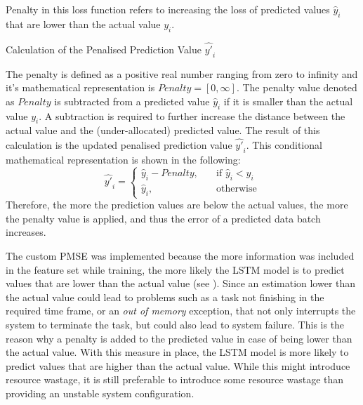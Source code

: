     Penalty in this loss function refers to increasing the loss of predicted values $\hat{y}_i$ that are lower than the actual value $y_i$.

    \begin{pabox}{Calculation of the Penalised Prediction Value $\hat{y'}_i$}
    \label{def:calculation-of-the-penalty-value}

      The penalty is defined as a positive real number ranging from zero to infinity and it's mathematical representation is $Penalty = [0, \infty]$.
      The penalty value denoted as $Penalty$ is subtracted from a predicted value $\hat{y}_i$ if it is smaller than the actual value $y_i$. A subtraction is required to further increase the distance between the actual value and the (under-allocated) predicted value.
      The result of this calculation is the updated penalised prediction value $\hat{y'}_i$.
      This conditional mathematical representation is shown in the following:
      $$\hat{y'}_i = 
      \begin{cases}
        \hat{y}_i - Penalty, & \quad \textrm{if } \hat{y}_i < y_i \\
        \hat{y}_i,  & \quad \textrm{otherwise}
      \end{cases}$$
      Therefore, the more the prediction values are below the actual values, the more the penalty value is applied, and thus the error of a predicted data batch increases.

    \end{pabox}

    The custom PMSE was implemented because the more information was included in the feature set while training, the more likely the LSTM model is to predict values that are lower than the actual value (see ). Since an estimation lower than the actual value could lead to problems such as a task not finishing in the required time frame, or an \emph{out of memory} exception, that not only interrupts the system to terminate the task, but could also lead to system failure. This is the reason why a penalty is added to the predicted value in case of being lower than the actual value. With this measure in place, the LSTM model is more likely to predict values that are higher than the actual value. While this might introduce resource wastage, it is still preferable to introduce some resource wastage than providing an unstable system configuration.

